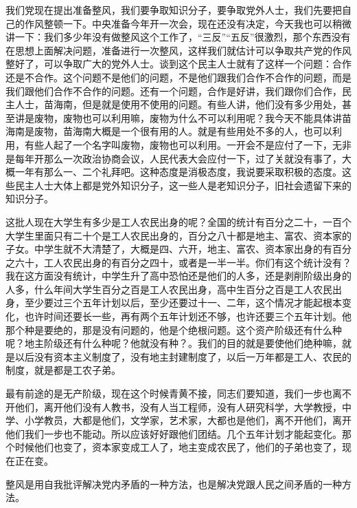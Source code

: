 我们党现在提出准备整风，我们要争取知识分子，要争取党外人士，我们先要把自己的作风整顿一下。中央准备今年开一次会，现在还没有决定，今天我也可以稍微讲一下：我们多少年没有做整风这个工作了，“三反”“五反”很激烈，那个东西没有在思想上面解决问题，准备进行一次整风，这样我们就估计可以争取共产党的作风整好了，可以争取广大的党外人士。谈到这个民主人士就有了这样一个问题：合作还是不合作。这个问题不是他们的问题，不是他们跟我们合作不合作的问题，而是我们跟他们合作不合作的问题。还有一个问题，合作是好讲，我们跟你们合作，民主人士，苗海南，但是就是使用不使用的问题。有些人讲，他们没有多少用处，甚至讲是废物，废物也可以利用嘛，废物为什么不可以利用呢？我今天不能具体讲苗海南是废物，苗海南大概是一个很有用的人。就是有些用处不多的人，也可以利用，有些人起了一个名字叫废物，废物也可以利用。一开会不是应付了一下，无非是每年开那么一次政治协商会议，人民代表大会应付一下，过了关就没有事了，大概一年有那么一、二个礼拜吧。这种态度是消极态度，我说要采取积极的态度。这些民主人士大体上都是党外知识分子，这一些人是老知识分子，旧社会遗留下来的知识分子。

这批人现在大学生有多少是工人农民出身的呢？全国的统计有百分之二十，一百个大学生里面只有二十个是工人农民出身的，百分之八十都是地主、富农、资本家的子女。中学生就不大清楚了，大概是四、六开，地主、富农、资本家出身的有百分之六十，工人农民出身的有百分之四十，或者是一半一半。你们有这个统计没有？我在这方面没有统计，中学生升了高中恐怕还是他们的人多，还是剥削阶级出身的人多，什么年间大学生百分之百是工人农民出身，高中生百分之百是工人农民出身，至少要过三个五年计划以后，至少还要过十一、二年，这个情况才能起根本变化，也许时间还要长一些，再有两个五年计划还不够，也许还要三个五年计划。他那个种是要绝的，那是没有问题的，他是个绝根问题。这个资产阶级还有什么种呢？地主阶级还有什么种呢？他就没有种？。我们的目的就是要使他们绝种嘛，就是以后没有资本主义制度了，没有地主封建制度了，以后一万年都是工人、农民的制度，就是都是工农子弟。

最有前途的是无产阶级，现在这个时候青黄不接，同志们要知道，我们一步也离不开他们，离开他们没有人教书，没有人当工程师，没有人研究科学，大学教授，中学、小学教员，大都是他们，文学家，艺术家，大都也是他们，离不开他们，离开他们我们一步也不能动。所以应该好好跟他们团结。几个五年计划才能起变化。那个时候他们也变了，资本家变成工人了，地主变成农民了，他们的子弟也变了，现在正在变。

整风是用自我批评解决党内矛盾的一种方法，也是解决党跟人民之间矛盾的一种方法。

